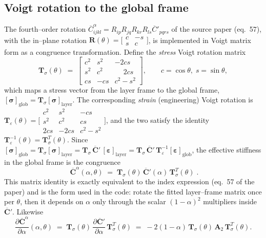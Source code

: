 \documentclass[12pt,a4paper]{article}
\newcommand{\bsig}{\boldsymbol{\sigma}}
\newcommand{\beps}{\boldsymbol{\varepsilon}}
\newcommand{\Ca}{\overline{\mathbf{C}}^{\alpha}}     %
\newcommand{\Cp}{\overline{\mathbf{C}}'}             %
\newcommand{\Tsig}{\mathbf{T}_{\!\sigma}}            %
\begin{document}
	\subsection{Voigt rotation to the global frame}

	The fourth--order rotation $\overline{C}^{\alpha}_{ijkl}=R_{ip}R_{jq}R_{kr}R_{ls}
	\overline{C}'_{pqrs}$ of the source paper (eq.~57), with the in--plane rotation
	$\mathbf{R}(\theta)=\bigl[\begin{smallmatrix}c&-s\\ s&c\end{smallmatrix}\bigr]$,
	is implemented in Voigt matrix form as a congruence transformation. Define the
	\emph{stress} Voigt rotation matrix
	\begin{equation}\label{eq:Tsig}
		\Tsig(\theta) \;=\;
		\begin{bmatrix}
			c^2 & s^2 & -2cs\\[2pt]
			s^2 & c^2 & \phantom{-}2cs\\[2pt]
			cs & -cs & c^2-s^2
		\end{bmatrix},
		\qquad c=\cos\theta,\; s=\sin\theta,
	\end{equation}
	which maps a stress vector from the layer frame to the global frame,
	$[\bsig]_{\text{glob}}=\Tsig[\bsig]_{\text{layer}}$. The corresponding
	\emph{strain} (engineering) Voigt rotation is
	$\mathbf{T}_\varepsilon(\theta)=\bigl[\begin{smallmatrix}
	c^2&s^2&-cs\\ s^2&c^2&cs\\ 2cs&-2cs&c^2-s^2\end{smallmatrix}\bigr]$, and the two
	satisfy the identity $\mathbf{T}_\varepsilon^{-1}(\theta)=\Tsig^{T}(\theta)$.
	Since $[\bsig]_{\text{glob}}=\Tsig[\bsig]_{\text{layer}}
	=\Tsig\,\Cp\,[\beps]_{\text{layer}}
	=\Tsig\,\Cp\,\mathbf{T}_\varepsilon^{-1}[\beps]_{\text{glob}}$, the effective
	stiffness in the global frame is the congruence
	\begin{equation}\label{eq:Carot}
		\boxed{\;\Ca(\alpha,\theta) \;=\; \Tsig(\theta)\,\Cp(\alpha)\,\Tsig^{T}(\theta)\;.}
	\end{equation}
	This matrix identity is exactly equivalent to the index expression (eq.~57 of
	the paper) and is the form used in the code: rotate the fitted layer--frame
	matrix once per $\theta$, then it depends on $\alpha$ only through the scalar
	$(1-\alpha)^2$ multipliers inside $\Cp$. Likewise
	\begin{equation}\label{eq:dCarot}
		\frac{\partial\Ca}{\partial\alpha}(\alpha,\theta)
		\;=\; \Tsig(\theta)\,\frac{\partial\Cp}{\partial\alpha}\,\Tsig^{T}(\theta)
		\;=\; -2(1-\alpha)\,\Tsig(\theta)\,\mathbf{A}_2\,\Tsig^{T}(\theta).
	\end{equation}
\end{document}
